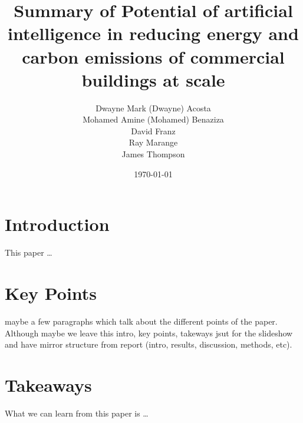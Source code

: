 \documentclass[a4paper,12pt]{article}
\title{Summary of Potential of artificial intelligence in reducing energy and carbon emissions of commercial buildings at scale}
\author{Dwayne Mark (Dwayne) Acosta \\ Mohamed Amine (Mohamed) Benaziza \\ David Franz \\ Ray Marange \\ James Thompson}
\date{\today}
\begin{document}
\maketitle

\section*{Introduction}

This paper \cite{dingPotentialArtificialIntelligence2024} \dots

\section*{Key Points}

maybe a few paragraphs which talk about the different points of the paper.
Although maybe we leave this intro, key points, takeways jsut for the slideshow and have mirror structure from report (intro, results, discussion, methods, etc).

\section*{Takeaways}

What we can learn from this paper is \dots



\end{document}
